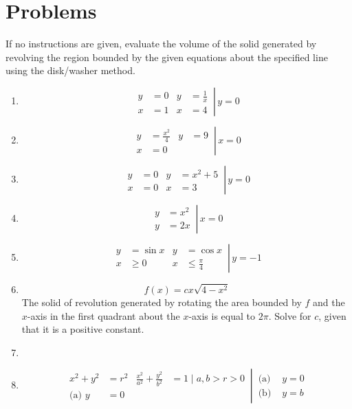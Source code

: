 \documentclass[12pt, A4]{report}
\begin{document}
		\section*{Problems}
			If no instructions are given, evaluate the volume of the solid generated by revolving the region bounded by the given equations about the specified line using the disk/washer method.
			\begin{enumerate}
				\item
					\[
						\left.\begin{aligned}
							y &= 0 &
								y &= \frac{1}{x} \\
							x &= 1 &
								x &= 4
						\end{aligned}\,\right|\, y = 0
					\]
				\item
					\[
						\left.\begin{aligned}
							y &= \frac{x^2}{4} &
								y &= 9 \\
							x &= 0
						\end{aligned}\,\right|\, x = 0
					\]
				\item
					\[
						\left.\begin{aligned}
							y &= 0 & 
								y &= x^2 + 5 \\
							x &= 0 &
								x &= 3
						\end{aligned}\,\right|\, y = 0
					\]
				\item
					\[
						\left.\begin{aligned}
							y &= x^2 \\
							y &= 2x 
						\end{aligned}\,\right|\, x = 0
					\]
				\item
					\[
						\left.\begin{aligned}
							y &= \sin x &
								y &= \cos x \\
							x &\ge 0 & 
								x &\le \frac{\pi}{4}
						\end{aligned}\,\right|\, y = -1
					\]
				\item
					\[f(x) = cx\sqrt{4 - x^2}\]
					The solid of revolution generated by rotating the area bounded by $f$ and the $x$-axis in the first quadrant about the $x$-axis is equal to $2\pi$. Solve for $c$, given that it is a positive constant.
				\item
				\item
					\[
						\left.\begin{aligned}
							x^2 + y^2 &= r^2 & 
								\frac{x^2}{a^2} + \frac{y^2}{b^2} &= 1 
								\mid a, b > r > 0\\
							\text{(a) } y &= 0
						\end{aligned}\,\right|\,
						\begin{aligned}
							\text{(a) } &y = 0 \\
							\text{(b) } &y = b
						\end{aligned}
					\]
			\end{enumerate}
			\newpage
\end{document}
